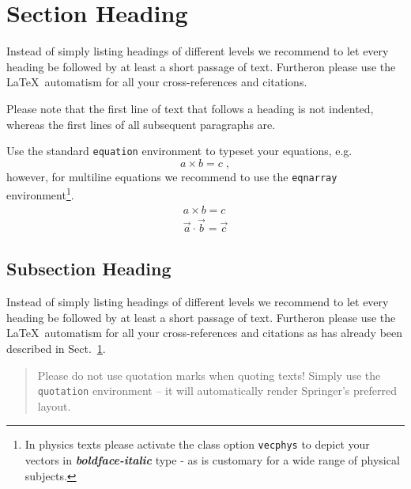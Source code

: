 \section{Section Heading}
\label{sec:2}
Instead of simply listing headings of different levels we recommend to let every heading be followed by at least a short passage of text. Furtheron please use the \LaTeX\ automatism for all your cross-references and citations.

Please note that the first line of text that follows a heading is not indented, whereas the first lines of all subsequent paragraphs are.

Use the standard \verb|equation| environment to typeset your equations, e.g.
%
\begin{equation}
a \times b = c\;,
\end{equation}
%
however, for multiline equations we recommend to use the \verb|eqnarray|
environment\footnote{In physics texts please activate the class option \texttt{vecphys} to depict your vectors in \textbf{\itshape boldface-italic} type - as is customary for a wide range of physical subjects.}.
\begin{eqnarray}
a \times b = c \nonumber\\
\vec{a} \cdot \vec{b}=\vec{c}
\label{eq:01}
\end{eqnarray}

\subsection{Subsection Heading}
\label{subsec:2}
Instead of simply listing headings of different levels we recommend to let every heading be followed by at least a short passage of text. Furtheron please use the \LaTeX\ automatism for all your cross-references and citations as has already been described in Sect.~\ref{sec:2}.

\begin{quotation}
Please do not use quotation marks when quoting texts! Simply use the \verb|quotation| environment -- it will automatically render Springer's preferred layout.
\end{quotation}


